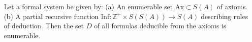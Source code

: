 Let a formal system be given by:
(a) An enumerable set $\mathrm{Ax} \subset S(A)$ of axioms.
(b) A partial recursive function $\mathrm{Inf}: \mathbb{Z}^+ \times S(S(A)) \to S(A)$ describing rules of deduction.
Then the set $D$ of all formulas deducible from the axioms is enumerable.